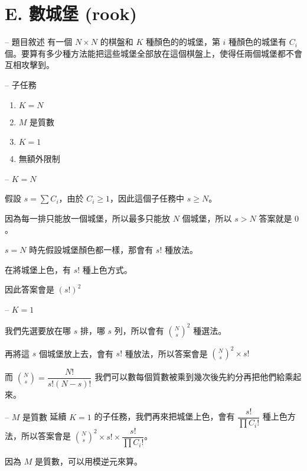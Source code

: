 \documentclass[hyperref,UTF8,notheorems,xcolor={dvipsnames}]{beamer}
\newcommand{\btitle}[1]{{\secname} -- #1}
\theoremstyle{definition}
\begin{document}
\section{E. 數城堡 (rook)}

\begin{frame}[fragile]{\btitle{題目敘述}}
	有一個 $N \times N$ 的棋盤和 $K$ 種顏色的的城堡，第 $i$ 種顏色的城堡有 $C_i$ 個。要算有多少種方法能把這些城堡全部放在這個棋盤上，使得任兩個城堡都不會互相攻擊到。
\end{frame}

\begin{frame}[fragile]{\btitle{子任務}}
	\begin{enumerate}
		\item $K = N$
		\item $M$ 是質數
		\item $K = 1$
		\item 無額外限制
	\end{enumerate}
\end{frame}

\begin{frame}[fragile]{\btitle{$K = N$}}

	假設 $s = \sum C_i$，由於 $C_i \ge 1$，因此這個子任務中 $s \ge N$。
	\pause

	因為每一排只能放一個城堡，所以最多只能放 $N$ 個城堡，所以 $s > N$ 答案就是 $0$。
	\pause

	$s = N$ 時先假設城堡顏色都一樣，那會有 $s!$ 種放法。
	
	在將城堡上色，有 $s!$ 種上色方式。

	因此答案會是 $(s!)^2$
\end{frame}

\begin{frame}[fragile]{\btitle{$K = 1$}}

	我們先選要放在哪 $s$ 排，哪 $s$ 列，所以會有 $\binom{N}{s}^2$ 種選法。
	\pause

	再將這 $s$ 個城堡放上去，會有 $s!$ 種放法，所以答案會是 $\binom{N}{s}^2 \times s!$
	\pause

	而 $\binom{N}{s} = \dfrac{N!}{s!(N-s)!}$ 我們可以數每個質數被乘到幾次後先約分再把他們給乘起來。

\end{frame}

\begin{frame}[fragile]{\btitle{$M$ 是質數}}
	延續 $K = 1$ 的子任務，我們再來把城堡上色，會有 $\dfrac{s!}{\prod{C_i!}}$ 種上色方法，所以答案會是 $\binom{N}{s}^2 \times s! \times \dfrac{s!}{\prod{C_i!}}$。
	
	因為 $M$ 是質數，可以用模逆元來算。
\end{frame}
\end{document}
